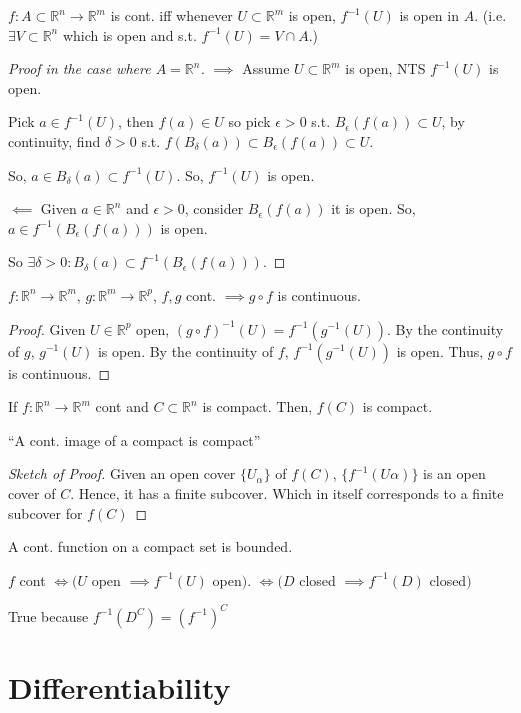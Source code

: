 \documentclass[a4paper]{article}
\numberwithin{equation}{section}
\newcommand{\R}{\mathbb{R}}
\begin{document}
\begin{theorem}

    $f:A\subset\R^n\to\R^m$ is cont. iff whenever $U\subset\R^m$ is open, $f^{-1}(U)$ is open in $A$. (i.e. $\exists V\subset\R^n$ which is open and s.t. $f^{-1}(U)=V\cap A$.)

    \begin{proof}[Proof in the case where $A=\R^n$] 
        $\implies$ Assume $U\subset\R^m$ is open, NTS $f^{-1}(U)$ is open.
        \vspace{10pt}

        Pick $a\in f^{-1}(U)$, then $f(a)\in U$ so pick $\epsilon>0$ s.t. $B_{\epsilon}(f(a))\subset U$, by continuity, find $\delta>0$ s.t. $f(B_{\delta}(a))\subset B_{\epsilon}(f(a))\subset U$.
        \vspace{10pt}

        So, $a\in B_{\delta}(a)\subset f^{-1}(U)$. So, $f^{-1}(U)$ is open.
        \vspace{10pt}

        $\impliedby$ Given $a\in\R^n$ and $\epsilon>0$, consider $B_\epsilon(f(a))$ it is open. So, $a\in f^{-1}(B_\epsilon(f(a)))$ is open.
        \vspace{10pt}

        So $\exists\delta>0:B_\delta(a)\subset f^{-1}(B_{\epsilon}(f(a)))$.        
    \end{proof}
\end{theorem}

\begin{theorem}
    $f:\R^n\to\R^m$, $g:\R^m\to\R^p$, $f,g$ cont. $\implies g\circ f$ is continuous. 
    \begin{proof}
        Given $U\in\R^p$ open, $(g\circ f)^{-1}(U)=f^{-1}(g^{-1}(U))$. By the continuity of $g$, $g^{-1}(U)$ is open. By the continuity of $f$, $f^{-1}(g^{-1}(U))$ is open. Thus, $g\circ f$ is continuous. 
    \end{proof}
\end{theorem}

\begin{theorem}
    If $f:\R^n\to\R^m$ cont and $C\subset\R^n$ is compact. Then, $f(C)$ is compact. 
    
    ``A cont. image of a compact is compact''
    \begin{proof}[Sketch of Proof]
        Given an open cover $\{U_\alpha\}$ of $f(C)$, $\{f^{-1}(U\alpha)\}$ is an open cover of $C$. Hence, it has a finite subcover. Which in itself corresponds to a finite subcover for $f(C)$
    \end{proof}
\end{theorem}
\begin{corollary}
    A cont. function on a compact set is bounded. 
\end{corollary}
\begin{theorem}
    $f$ cont $\iff (U$ open $\implies f^{-1}(U)$ open$)$. $\iff (D$ closed $\implies f^{-1}(D)$ closed$)$

    True because $f^{-1}(D^C)=(f^{-1})^C$
\end{theorem}
\section{Differentiability}
\begin{definition}[Differentiability]
    
\end{definition}
\end{document}
